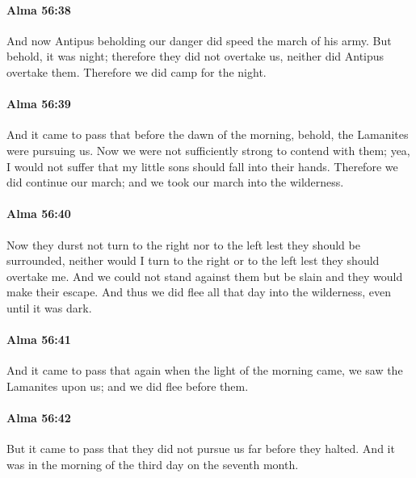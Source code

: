 		\paragraph{Alma 56:38} %
			\label{ALMA-56-38}

			And now Antipus beholding our danger
			did speed the march of his army.
			But behold, it was night;
			therefore they did not overtake us,
			neither did Antipus overtake them.
			Therefore we did camp for the night.

		\paragraph{Alma 56:39} %
			\label{ALMA-56-39}

			And it came to pass that before the dawn of the morning,
			behold, the Lamanites were pursuing us.
			Now we were not sufficiently strong to contend with them;
			yea, I would not suffer that my little sons should fall into their hands.
			Therefore we did continue our march;
			and we took our march into the wilderness.

		\paragraph{Alma 56:40} %
			\label{ALMA-56-40}

			Now they durst not turn to the right nor to the left lest they should be surrounded,
			neither would I turn to the right or to the left lest they should overtake me.
			And we could not stand against them but be slain
			and they would make their escape.
			And thus we did flee all that day into the wilderness,
			even until it was dark.

		\paragraph{Alma 56:41} %
			\label{ALMA-56-41}

			And it came to pass that again when the light of the morning came,
			we saw the Lamanites upon us;
			and we did flee before them.

		\paragraph{Alma 56:42} %
			\label{ALMA-56-42}

			But it came to pass that they did not pursue us far before they halted.
			And it was in the morning of the third day on the seventh month.

